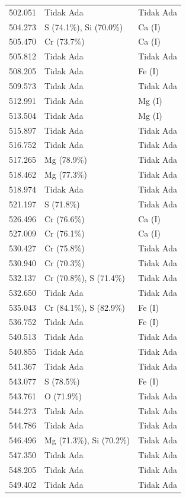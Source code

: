 \begin{onehalfspace}
\begin{longtable}{p{} p{} p{}}
    502.051 & Tidak Ada & Tidak Ada \\
    504.273 & S (74.1\%), Si (70.0\%) & Ca (I) \\
    505.470 & Cr (73.7\%) & Ca (I) \\
    505.812 & Tidak Ada & Tidak Ada \\
    508.205 & Tidak Ada & Fe (I) \\
    509.573 & Tidak Ada & Tidak Ada \\
    512.991 & Tidak Ada & Mg (I) \\
    513.504 & Tidak Ada & Mg (I) \\
    515.897 & Tidak Ada & Tidak Ada \\
    516.752 & Tidak Ada & Tidak Ada \\
    517.265 & Mg (78.9\%) & Tidak Ada \\
    518.462 & Mg (77.3\%) & Tidak Ada \\
    518.974 & Tidak Ada & Tidak Ada \\
    521.197 & S (71.8\%) & Tidak Ada \\
    526.496 & Cr (76.6\%) & Ca (I) \\
    527.009 & Cr (76.1\%) & Ca (I) \\
    530.427 & Cr (75.8\%) & Tidak Ada \\
    530.940 & Cr (70.3\%) & Tidak Ada \\
    532.137 & Cr (70.8\%), S (71.4\%) & Tidak Ada \\
    532.650 & Tidak Ada & Tidak Ada \\
    535.043 & Cr (84.1\%), S (82.9\%) & Fe (I) \\
    536.752 & Tidak Ada & Fe (I) \\
    540.513 & Tidak Ada & Tidak Ada \\
    540.855 & Tidak Ada & Tidak Ada \\
    541.367 & Tidak Ada & Tidak Ada \\
    543.077 & S (78.5\%) & Fe (I) \\
    543.761 & O (71.9\%) & Tidak Ada \\
    544.273 & Tidak Ada & Tidak Ada \\
    544.786 & Tidak Ada & Tidak Ada \\
    546.496 & Mg (71.3\%), Si (70.2\%) & Tidak Ada \\
    547.350 & Tidak Ada & Tidak Ada \\
    548.205 & Tidak Ada & Tidak Ada \\
    549.402 & Tidak Ada & Tidak Ada \\

\end{longtable}
\end{onehalfspace}
